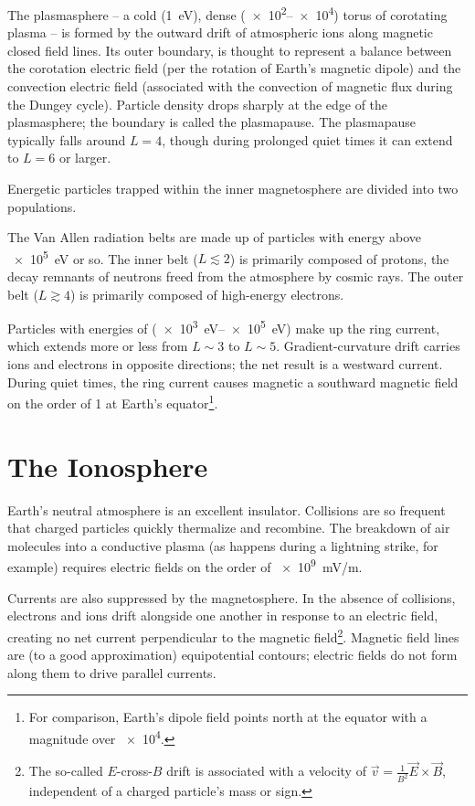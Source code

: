 The plasmasphere -- a cold (\about\SI{1}{\eV}), dense (\SIrange{e2}{e4}{\percc}) torus of corotating plasma -- is formed by the outward drift of atmospheric ions along magnetic closed field lines. Its outer boundary, is thought to represent a balance between the corotation electric field (per the rotation of Earth's magnetic dipole) and the convection electric field (associated with the convection of magnetic flux during the Dungey cycle). Particle density drops sharply at the edge of the plasmasphere; the boundary is called the plasmapause. The plasmapause typically falls around $L=4$, though during prolonged quiet times it can extend to $L=6$ or larger. 

Energetic particles trapped within the inner magnetosphere are divided into two populations. 

The Van Allen radiation belts are made up of particles with energy above \SI{e5}{\eV} or so. The inner belt ($L\lesssim2$) is primarily composed of protons, the decay remnants of neutrons freed from the atmosphere by cosmic rays. The outer belt ($L\gtrsim4$) is primarily composed of high-energy electrons. 

Particles with energies of (\SIrange{e3}{e5}{\eV}) make up the ring current, which extends more or less from $L\sim3$ to $L\sim5$. Gradient-curvature drift carries ions and electrons in opposite directions; the net result is a westward current. During quiet times, the ring current causes magnetic a southward magnetic field on the order of \SI{1}{\nT} at Earth's equator\footnote{For comparison, Earth's dipole field points north at the equator with a magnitude over \SI{e4}{\nT}. }. 

\section{The Ionosphere}
  \label{sec_ionos}

Earth's neutral atmosphere is an excellent insulator. Collisions are so frequent that charged particles quickly thermalize and recombine. The breakdown of air molecules into a conductive plasma (as happens during a lightning strike, for example) requires electric fields on the order of \SI{e9}{\mV/\m}. 

Currents are also suppressed by the magnetosphere. In the absence of collisions, electrons and ions drift alongside one another in response to an electric field, creating no net current perpendicular to the magnetic field\footnote{The so-called $E$-cross-$B$ drift is associated with a velocity of $\vec{v} = \frac{1}{B^2} \vec{E} \times \vec{B}$, independent of a charged particle's mass or sign. }. Magnetic field lines are (to a good approximation) equipotential contours; electric fields do not form along them to drive parallel currents. 

